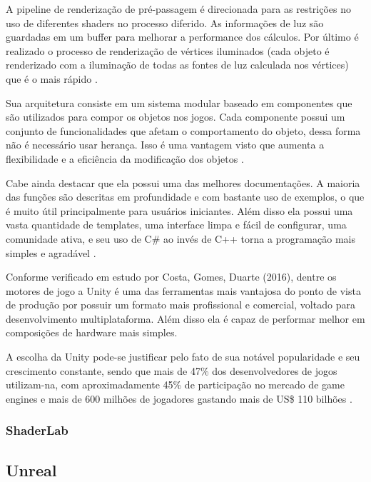 A pipeline de renderização de pré-passagem é direcionada para as restrições no uso de diferentes shaders no processo diferido. As informações de luz são guardadas em um buffer para melhorar a performance dos cálculos. Por último é realizado o processo de renderização de vértices iluminados (cada objeto é renderizado com a iluminação de todas as fontes de luz calculada nos vértices) que é o mais rápido \cite{simon2015unity}. 

Sua arquitetura consiste em um sistema modular baseado em componentes que são utilizados para compor os objetos nos jogos. Cada componente possui um conjunto de funcionalidades que afetam o comportamento do objeto, dessa forma não é necessário usar herança. Isso é uma vantagem visto que aumenta a flexibilidade e a eficiência da modificação dos objetos \cite{compStudyGE}.

Cabe ainda destacar que ela possui uma das melhores documentações. A maioria das funções são descritas em profundidade e com bastante uso de exemplos, o que é muito útil principalmente para usuários iniciantes. Além disso ela possui uma vasta quantidade de templates, uma interface limpa e fácil de configurar, uma comunidade ativa, e seu uso de C\# ao invés de C++ torna a programação mais simples e agradável \cite{compStudyGE}.

Conforme verificado em estudo por Costa, Gomes, Duarte (2016)\nocite{estudoUnity}, dentre os motores de jogo a Unity é uma das ferramentas mais vantajosa do ponto de vista de produção por possuir um formato mais profissional e comercial, voltado para desenvolvimento multiplataforma. Além disso ela é capaz de performar melhor em composições de hardware mais simples.

A escolha da Unity pode-se justificar pelo fato de sua notável popularidade e seu crescimento constante, sendo que mais de 47\% dos desenvolvedores de jogos utilizam-na, com aproximadamente 45\% de participação no mercado de game engines e mais de 600 milhões de jogadores gastando mais de US\$ 110 bilhões \cite{simon2015unity}.

\subsubsection{ShaderLab}
\label{sec:shaderlab}

\subsection{Unreal}
\label{sec:unreal}

